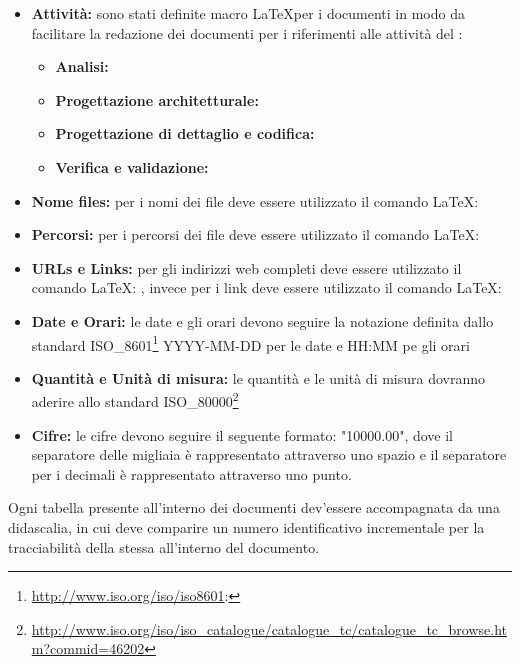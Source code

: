 \documentclass[12pt,a4paper]{article}
\begin{document}
\begin{itemize}
\begin{itemize}
		\item \textbf{\MU:} 
	\end{itemize}
	\item \textbf{Attività:} sono stati definite macro  \LaTeX per i documenti in modo da facilitare la redazione dei documenti per i riferimenti alle attività del \PdP: 
	\begin{itemize}
		\item \textbf{Analisi:} 
		\item \textbf{Progettazione architetturale:} 
		\item \textbf{Progettazione di dettaglio e codifica:} 
		\item \textbf{Verifica e validazione:} 
	\end{itemize}
\end{itemize}

\label{formati}
\begin{itemize}
	\item \textbf{Nome files:} per i nomi dei file deve essere utilizzato il comando \LaTeX: 
	\item  \textbf{Percorsi:} per i percorsi dei file deve essere utilizzato il comando \LaTeX: 
	\item \textbf{URLs e Links:}  per gli indirizzi web completi deve essere utilizzato il comando \LaTeX: , invece per i link deve essere utilizzato il comando \LaTeX: 
	\item \textbf{Date e Orari:} le date e gli orari devono seguire la notazione definita dallo standard ISO\_8601\footnote{\url{http://www.iso.org/iso/iso8601}:} YYYY-MM-DD per le date e HH:MM pe gli orari
	\item \textbf{Quantità e Unità di misura:} le quantità e le unità di misura dovranno aderire allo standard ISO\_80000\footnote{\url{http://www.iso.org/iso/iso_catalogue/catalogue_tc/catalogue_tc_browse.htm?commid=46202}}
	\item \textbf{Cifre:} le cifre devono seguire il seguente formato: "\num{10000.00}", dove il separatore delle migliaia è rappresentato attraverso uno spazio e il separatore per i decimali è rappresentato attraverso uno punto.
\end{itemize}

Ogni tabella presente all'interno dei documenti dev'essere accompagnata da una didascalia, in cui deve comparire un numero identificativo incrementale per la tracciabilità della stessa all'interno del documento.
\end{document}
